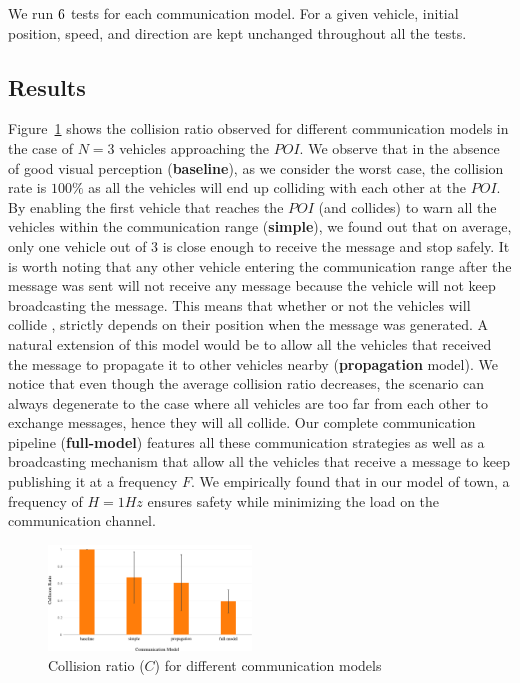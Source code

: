 We run $\num_test_per_scenario$ tests for each communication model. For a given vehicle, initial position,
speed, and direction are kept unchanged throughout all the tests.

\subsection{Results}

Figure~\ref{fig:collision_ratio} shows the collision ratio observed for different communication models in the
case of $N=3$ vehicles approaching the $POI$. We observe that in the absence of good visual perception
(\textbf{baseline}), as we consider the worst case, the collision rate is $100\%$ as all the vehicles will end up
colliding with each other at the $POI$. By enabling the first vehicle that reaches the $POI$ (and collides) to
warn all the vehicles within the communication range (\textbf{simple}), we found out that on
average, only one vehicle out of $3$ is close enough to receive the message and stop safely. It is worth noting
that any other vehicle entering the communication range after the message was sent will not receive any message
because the vehicle will not keep broadcasting the message. This means that whether or not the vehicles will collide
, strictly depends on their position when the message was generated. A natural extension of this model
would be to allow all the vehicles that received the message to propagate it to other vehicles nearby
(\textbf{propagation} model). We notice that even though the average collision ratio decreases,
the scenario can always degenerate to the case where all vehicles are too far from each other to exchange
messages, hence they will all collide.
Our complete communication pipeline (\textbf{full-model}) features all these communication strategies as well
as a broadcasting mechanism that allow all the vehicles that receive a message to keep publishing it at a frequency
$F$. We empirically found that in our model of town, a frequency of $H=1Hz$ ensures safety while minimizing
the load on the communication channel.

\begin{figure}[t]
    \centering
    \includegraphics[width=0.48\textwidth, height=0.24\textwidth]{figures/collision_ratio.pdf}
    \caption{Collision ratio ($C$) for different communication models \label{fig:collision_ratio}}
\end{figure}

